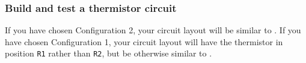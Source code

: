 \subsubsection{\howto Build and test a thermistor circuit}
If you have chosen Configuration 2, your circuit layout will be similar to .
If you have chosen Configuration 1, your circuit layout will have the thermistor in position \texttt{R1} rather than \texttt{R2}, but be otherwise similar to .

\begin{marginfigure}[-8cm]
	\begin{center}

\end{center}
\end{marginfigure}
